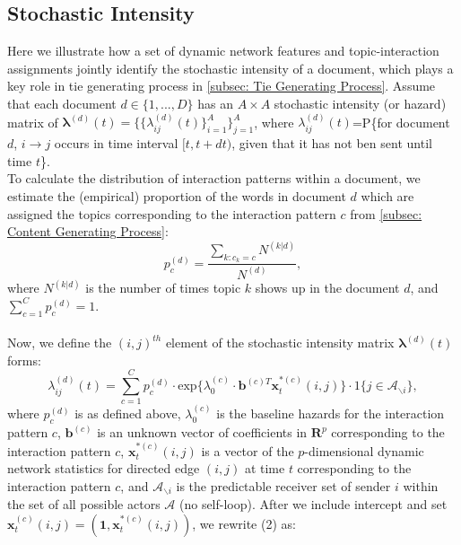 \documentclass[a4paper]{article}
\begin{document}
\subsection{Stochastic Intensity} \label{subsec: Stochastic Intensity}
Here we illustrate how a set of dynamic network features and topic-interaction assignments  jointly identify the stochastic intensity of a document, which plays a key role in tie generating process in \ref{subsec: Tie Generating Process}. Assume that each document $d \in \{1,...,D\}$ has an $A\times A$ stochastic intensity (or hazard) matrix of $\boldsymbol{\lambda}^{(d)}(t) = \{\{\lambda^{(d)}_{ij}(t)\}_{i=1}^{A}\}_{j=1}^{A}$, where $\lambda^{(d)}_{ij}(t)$=P\{for document $d$, $i\rightarrow j$ occurs in time interval $[t, t+dt)$, given that it has not ben sent until time $t$\}. \\ \newline
To calculate the distribution of interaction patterns within a document, we estimate the (empirical) proportion of the words in document $d$ which are assigned the topics corresponding to the interaction pattern $c$ from \ref{subsec: Content Generating Process}: 
\begin{equation}
p_c^{(d)} = \frac{\sum\limits_{k: c_k=c} N^{(k|d)}}{N^{(d)}},
\end{equation}
where $N^{(k|d)}$ is the number of times topic $k$ shows up in the document $d$, and $\sum\limits_{c=1}^{C}p_c^{(d)}=1$.\\\\ \newline
Now, we define the $(i, j)^{th}$ element of the stochastic intensity matrix $\boldsymbol{\lambda}^{(d)}(t)$ forms:
\begin{equation}
\lambda^{(d)}_{ij}(t)=\sum\limits_{c=1}^{C} p^{(d)}_c
\cdot  \mbox{exp}\Big\{\lambda^{(c)}_0\cdot \boldsymbol{b}^{(c)T}\boldsymbol{x}^{*(c)}_t(i, j)\Big\}\cdot 1\{j \in \mathcal{A}_{\backslash i}\},
\end{equation}
where $p_c^{(d)}$ is as defined above, $\lambda^{(c)}_0$ is the baseline hazards for the interaction pattern $c$, $\boldsymbol{b}^{(c)}$ is an unknown vector of coefficients in $\boldsymbol{R}^{p}$ corresponding to the interaction pattern $c$, $\boldsymbol{x}^{*(c)}_t(i, j)$ is a vector of the $p$-dimensional dynamic network statistics for directed edge $(i, j)$ at time $t$ corresponding to the interaction pattern $c$, and $\mathcal{A}_{\backslash i}$ is the predictable receiver set of sender $i$ within the set of all possible actors $\mathcal{A}$ (no self-loop). After we include intercept and set $\boldsymbol{x}^{(c)}_t(i, j)=(\boldsymbol{1}, \boldsymbol{x}^{*(c)}_t(i, j))$, we rewrite (2) as: 
\end{document}
